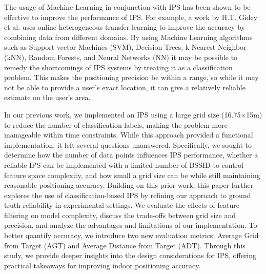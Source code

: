\documentclass[conference]{IEEEtran}
\begin{document}
	The usage of Machine Learning in conjunction with IPS has been shown to be effective to improve the performance of IPS. For example, a work by H.T. Gidey et al. \cite{bgp3} uses online heterogeneous transfer learning to improve the accuracy by combining data from different domains. By using Machine Learning algorithms such as Support vector Machines (SVM), Decision Trees, k-Nearest Neighbor (kNN), Random Forests, and Neural Networks (NN) it may be possible to remedy the shortcomings of IPS systems by treating it as a classification problem. This makes the positioning precision be within a range, so while it may not be able to provide a user's exact location, it can give a relatively reliable estimate on the user's area.
	
	In our previous work, we implemented an IPS using a large grid size (16.75×15m) to reduce the number of classification labels, making the problem more manageable within time constraints. While this approach provided a functional implementation, it left several questions unanswered. Specifically, we sought to determine how the number of data points influences IPS performance, whether a reliable IPS can be implemented with a limited number of BSSID to control feature space complexity, and how small a grid size can be while still maintaining reasonable positioning accuracy.
	Building on this prior work, this paper further explores the use of classification-based IPS by refining our approach to ground truth reliability in experimental settings. We evaluate the effects of feature filtering on model complexity, discuss the trade-offs between grid size and precision, and analyze the advantages and limitations of our implementation. To better quantify accuracy, we introduce two new evaluation metrics: Average Grid from Target (AGT) and Average Distance from Target (ADT). Through this study, we provide deeper insights into the design considerations for IPS, offering practical takeaways for improving indoor positioning accuracy.
	

	
\end{document}
